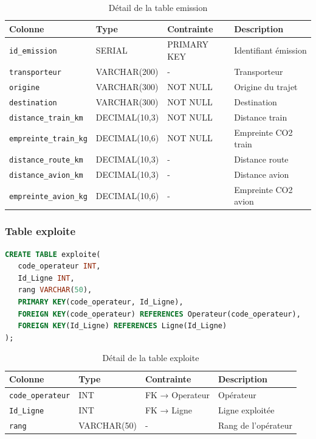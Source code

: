 \documentclass[12pt,a4paper]{article}
\begin{document}
\begin{table}[h!]
\centering
\begin{tabular}{|p{3.5cm}|p{2.5cm}|p{2.5cm}|p{4cm}|}
\hline
\textbf{Colonne} & \textbf{Type} & \textbf{Contrainte} & \textbf{Description} \\
\hline
\texttt{id\_emission} & SERIAL & PRIMARY KEY & Identifiant émission \\
\hline
\texttt{transporteur} & VARCHAR(200) & - & Transporteur \\
\hline
\texttt{origine} & VARCHAR(300) & NOT NULL & Origine du trajet \\
\hline
\texttt{destination} & VARCHAR(300) & NOT NULL & Destination \\
\hline
\texttt{distance\_train\_km} & DECIMAL(10,3) & NOT NULL & Distance train \\
\hline
\texttt{empreinte\_train\_kg} & DECIMAL(10,6) & NOT NULL & Empreinte CO2 train \\
\hline
\texttt{distance\_route\_km} & DECIMAL(10,3) & - & Distance route \\
\hline
\texttt{distance\_avion\_km} & DECIMAL(10,3) & - & Distance avion \\
\hline
\texttt{empreinte\_avion\_kg} & DECIMAL(10,6) & - & Empreinte CO2 avion \\
\hline
\end{tabular}
\caption{Détail de la table emission}
\end{table}

\subsubsection{Table exploite}
\begin{lstlisting}[language=SQL, caption=Structure de la table exploite]
CREATE TABLE exploite(
   code_operateur INT,
   Id_Ligne INT,
   rang VARCHAR(50),
   PRIMARY KEY(code_operateur, Id_Ligne),
   FOREIGN KEY(code_operateur) REFERENCES Operateur(code_operateur),
   FOREIGN KEY(Id_Ligne) REFERENCES Ligne(Id_Ligne)
);
\end{lstlisting}

\begin{table}[h!]
\centering
\begin{tabular}{|p{3.5cm}|p{2.5cm}|p{2.5cm}|p{4cm}|}
\hline
\textbf{Colonne} & \textbf{Type} & \textbf{Contrainte} & \textbf{Description} \\
\hline
\texttt{code\_operateur} & INT & FK → Operateur & Opérateur \\
\hline
\texttt{Id\_Ligne} & INT & FK → Ligne & Ligne exploitée \\
\hline
\texttt{rang} & VARCHAR(50) & - & Rang de l'opérateur \\
\hline
\end{tabular}
\caption{Détail de la table exploite}
\end{table}
\end{document}
